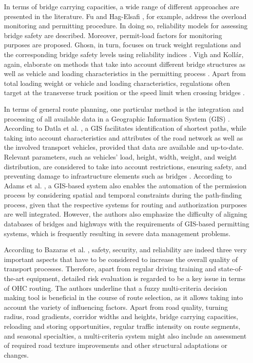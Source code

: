 \par
In terms of bridge carrying capacities, a wide range of different approaches are presented in the literature. Fu and Hag-Elsafi \cite{fu2000vehicular}, for example, address the overload monitoring and permitting procedure. In doing so, reliability models for assessing bridge safety are described. Moreover, permit-load factors for monitoring purposes are proposed. Ghosn, in turn, focuses on truck weight regulations and the corresponding bridge safety levels using reliability indices \cite{ghosn2000development}. Vigh and Kollár, again, elaborate on methods that take into account different bridge structures as well as vehicle and loading characteristics in the permitting process \cite{vigh2006approximate, vigh2007routing}. Apart from total loading weight or vehicle and loading characteristics, regulations often target at the transverse truck position or the speed limit when crossing bridges \cite{yan2018optimal}.
\par
In terms of general route planning, one particular method is the integration and processing of all available data in a Geographic Information System (GIS) \cite{durham2002gis}.
According to Datla et al. \cite{datla2004gis}, a GIS facilitates identification of shortest paths, while taking into account characteristics and attributes of the road network as well as the involved transport vehicles, provided that data are available and up-to-date. Relevant parameters, such as vehicles' load, height, width, weight, and weight distribution, are considered to take into account restrictions, ensuring safety, and preventing damage to infrastructure elements such as bridges \cite{ecmt2006improving, vaitkus2016effect, kombe2017modelling, pauer2017development}. According to Adams et al. \cite{adams2002enterprise}, a GIS-based system also enables the automation of the permission process by considering spatial and temporal constraints during the path-finding process, given that the respective systems for routing and authorization purposes are well integrated. However, the authors also emphasize the difficulty of aligning databases of bridges and highways with the requirements of GIS-based permitting systems, which is frequently resulting in severe data management problems.
\par
According to Bazaras et al. \cite{Bazaras.2013}, safety, security, and reliability are indeed three very important aspects that have to be considered to increase the overall quality of transport processes. Therefore, apart from regular driving training and state-of-the-art equipment, detailed risk evaluation is regarded to be a key issue in terms of OHC routing. The authors underline that a fuzzy multi-criteria decision making tool is beneficial in the course of route selection, as it allows taking into account the variety of influencing factors. Apart from road quality, turning radius, road gradients, corridor widths and heights, bridge carrying capacities, reloading and storing opportunities, regular traffic intensity on route segments, and seasonal specialties, a multi-criteria system might also include an assessment of required road texture improvements and other structural adaptations or changes.
